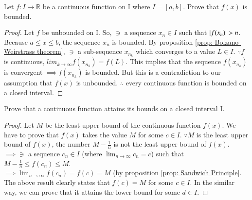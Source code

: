 \documentclass[journal,12pt,twocolumn]{IEEEtran}
\begin{document}
\begin{problem}
Let $f:I\to\mathbb{R}$ be a continuous function on I where $I=[a,b]$. Prove that $f(x)$ is bounded.
\end{problem}
\begin{proof}
Let $f$ be unbounded on I. So, $\ni$ a sequence $x_n \in I$ such that $\left\vert f(x_n)\right\vert>n$. Because $a\le x\le b$, the sequence $x_n$ is bounded. By proposition \ref{prop: Bolzano-Weirstrass theorem}, $\ni$ a sub-sequence $x_{n_k}$ which converges to a value $L \in I$. $\because f$ is continuous, $lim_{k \to \infty} f(x_{n_k}) = f(L)$. This implies that the sequence $f(x_{n_k})$ is convergent $\implies f(x_{n_k})$ is bounded. But this is a contradiction to our assumption that $f(x)$ is unbounded.
$\therefore$ every continuous function is bounded on a closed interval.    
\end{proof}
\begin{problem}
Prove that a continuous function attains its bounds on a closed interval I.
\end{problem}
\begin{proof}
Let $M$ be the least upper bound of the continuous function $f(x)$. We have to prove that $f(x)$ takes the value $M$ for some $c \in I$. $\because M$ is the least upper bound of $f(x)$, the number $M-\frac{1}{n}$ is not the least upper bound of $f(x)$.
\\
$\implies \ni$ a sequence $c_n \in I$ (where $\lim_{n \to \infty} c_n = c$) such that $M-\frac{1}{n}\le f(c_n)\le M$.
\\
$\implies \lim_{n \to \infty}f(c_n)=f(c)=M$ (by proposition \ref{prop: Sandwich Principle}.
The above result clearly states that $f(c)=M$ for some $c \in I$. In the similar way, we can prove that it attains the lower bound for some $d \in I$. 
\end{proof}
%
\end{document}
